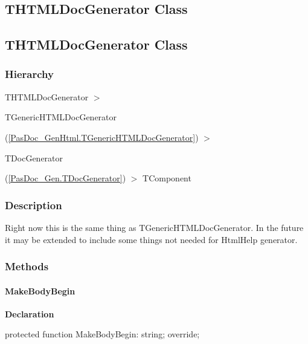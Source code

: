 \documentclass{report}
\newif\ifpdf
\begin{document}
\subsection*{\large{\textbf{THTMLDocGenerator Class}}\normalsize\hspace{1ex}\hrulefill}
\else
\subsection*{THTMLDocGenerator Class}
\fi
\label{PasDoc_GenHtml.THTMLDocGenerator}
\subsubsection*{\large{\textbf{Hierarchy}}\normalsize\hspace{1ex}\hfill}
THTMLDocGenerator {$>$} \begin{ttfamily}TGenericHTMLDocGenerator\end{ttfamily}(\ref{PasDoc_GenHtml.TGenericHTMLDocGenerator}) {$>$} \begin{ttfamily}TDocGenerator\end{ttfamily}(\ref{PasDoc_Gen.TDocGenerator}) {$>$} 
TComponent
\subsubsection*{\large{\textbf{Description}}\normalsize\hspace{1ex}\hfill}
Right now this is the same thing as TGenericHTMLDocGenerator. In the future it may be extended to include some things not needed for HtmlHelp generator.\subsubsection*{\large{\textbf{Methods}}\normalsize\hspace{1ex}\hfill}
\paragraph*{MakeBodyBegin}\hspace*{\fill}

\label{PasDoc_GenHtml.THTMLDocGenerator-MakeBodyBegin}
\begin{list}{}{
\setlength{\itemindent}{0cm}
\setlength{\listparindent}{0cm}
\setlength{\leftmargin}{\evensidemargin}
\addtolength{\leftmargin}{\tmplength}
\settowidth{\labelsep}{X}
\addtolength{\leftmargin}{\labelsep}
\setlength{\labelwidth}{\tmplength}
}
\item[\textbf{Declaration}\hfill]
\ifpdf
\begin{flushleft}
\fi
\begin{ttfamily}
protected function MakeBodyBegin: string; override;\end{ttfamily}

\ifpdf
\end{flushleft}
\fi

\end{list}
\end{document}
